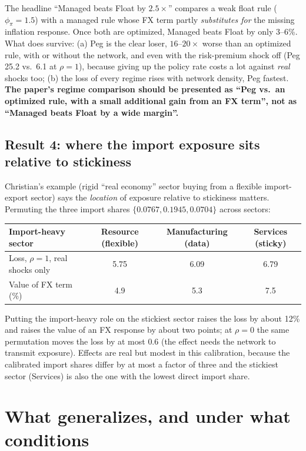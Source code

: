 \documentclass[11pt]{article}
\newcommand{\claim}[1]{\textbf{#1}}
\begin{document}
The headline ``Managed beats Float by $2.5\times$'' compares a weak float rule ($\phi_\pi=1.5$) with a managed rule whose
FX term partly \emph{substitutes for} the missing inflation response. Once both are optimized, Managed beats Float by only
$3$--$6$\%. What does survive: (a) Peg is the clear loser, $16$--$20\times$ worse than an optimized rule, with or without the network,
and even with the risk-premium shock off (Peg 25.2 vs.\ 6.1 at $\rho=1$), because giving up the policy rate costs a lot against
\emph{real} shocks too; (b) the loss of every regime rises with network density, Peg fastest. \claim{The paper's regime comparison
should be presented as ``Peg vs.\ an optimized rule, with a small additional gain from an FX term'', not as ``Managed beats Float
by a wide margin''.}

\subsection{Result 4: where the import exposure sits relative to stickiness}

Christian's example (rigid ``real economy'' sector buying from a flexible import-export sector) says the \emph{location} of
exposure relative to stickiness matters. Permuting the three import shares $\{0.0767,0.1945,0.0704\}$ across sectors:
\begin{table}[H]
\centering\small
\begin{tabular}{lccc}
\toprule
Import-heavy sector & Resource (flexible) & Manufacturing (data) & Services (sticky) \\
\midrule
Loss, $\rho=1$, real shocks only & 5.75 & 6.09 & 6.79 \\
Value of FX term (\%) & 4.9 & 5.3 & 7.5 \\
\bottomrule
\end{tabular}
\end{table}
Putting the import-heavy role on the stickiest sector raises the loss by about 12\% and raises the value of an FX response by about
two points; at $\rho=0$ the same permutation moves the loss by at most $0.6$ (the effect needs the network to transmit exposure). Effects
are real but modest in this calibration, because the calibrated import shares differ by at most a factor of three and the stickiest sector
(Services) is also the one with the lowest direct import share.

\section{What generalizes, and under what conditions}
\end{document}
